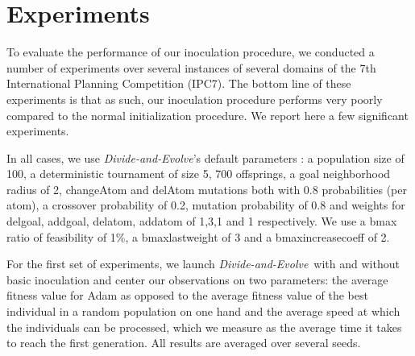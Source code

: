 \documentclass[english]{DESCARWINreport}
\newcommand{\dae}{{\em Divide-and-Evolve}}
\begin{document}
\begin{algorithm}[h!]
\caption{$estimate b_{max} insemination$}
{\small
\begin{algorithmic}[1]

\ENDFOR


\ENDIF
\ENDFOR

\ENDWHILE
{}
\ENDWHILE

\end{algorithmic}
}
\end{algorithm}


\newpage

\section{Experiments}

To evaluate the performance of our inoculation procedure, we conducted a number of experiments over several instances of several domains of the 7th International Planning Competition (IPC7). The bottom line of these experiments is that as such, our inoculation procedure performs very poorly compared to the normal initialization procedure. We report here a few significant experiments.

In all cases, we use \dae's default parameters : a population size of 100, a deterministic tournament of size 5, 700 offsprings, a goal neighborhood radius of 2, changeAtom and delAtom mutations both with 0.8 probabilities (per atom), a crossover probability of 0.2, mutation probability of 0.8 and weights for delgoal, addgoal, delatom, addatom of 1,3,1 and 1 respectively. We use a bmax ratio of feasibility of 1\%, a bmaxlastweight of 3 and a bmaxincreasecoeff of 2.

For the first set of experiments, we launch \dae\ with and without basic inoculation and center our observations on two parameters: the average fitness value for Adam as opposed to the average fitness value of the best individual in a random population on one hand and the average speed at which the individuals can be processed, which we measure as the average time it takes to reach the first generation. All results are averaged over several seeds.
\end{document}
